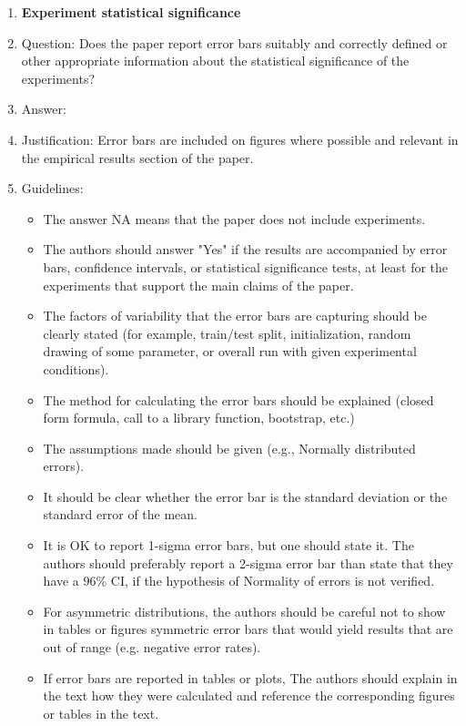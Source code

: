 \documentclass{article}
\theoremstyle{plain}
\theoremstyle{definition}
\theoremstyle{remark}
\begin{document}
\begin{enumerate}
\item {\bf Experiment statistical significance}
    \item[] Question: Does the paper report error bars suitably and correctly defined or other appropriate information about the statistical significance of the experiments?
    \item[] Answer: \answerYes{} %
    \item[] Justification: Error bars are included on figures where possible and relevant in the empirical results section of the paper.
    \item[] Guidelines:
    \begin{itemize}
        \item The answer NA means that the paper does not include experiments.
        \item The authors should answer "Yes" if the results are accompanied by error bars, confidence intervals, or statistical significance tests, at least for the experiments that support the main claims of the paper.
        \item The factors of variability that the error bars are capturing should be clearly stated (for example, train/test split, initialization, random drawing of some parameter, or overall run with given experimental conditions).
        \item The method for calculating the error bars should be explained (closed form formula, call to a library function, bootstrap, etc.)
        \item The assumptions made should be given (e.g., Normally distributed errors).
        \item It should be clear whether the error bar is the standard deviation or the standard error of the mean.
        \item It is OK to report 1-sigma error bars, but one should state it. The authors should preferably report a 2-sigma error bar than state that they have a 96\% CI, if the hypothesis of Normality of errors is not verified.
        \item For asymmetric distributions, the authors should be careful not to show in tables or figures symmetric error bars that would yield results that are out of range (e.g. negative error rates).
        \item If error bars are reported in tables or plots, The authors should explain in the text how they were calculated and reference the corresponding figures or tables in the text.
    \end{itemize}


\end{enumerate}
\end{document}
